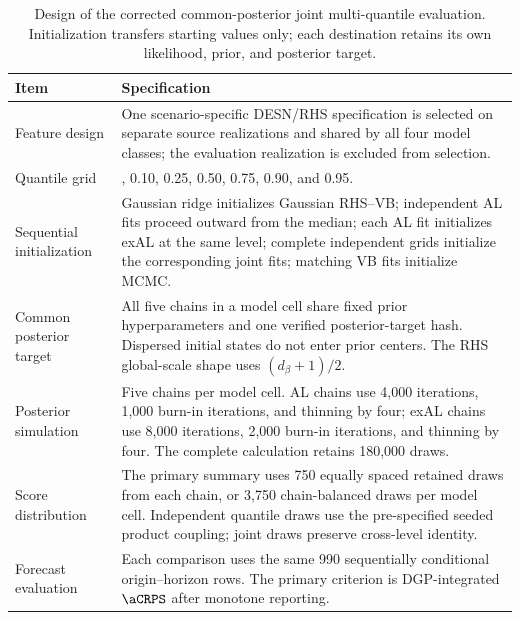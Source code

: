 \begin{table}[!htbp]
\centering
\scriptsize
\begin{tabular}{@{}>{\raggedright\arraybackslash}p{}>{\raggedright\arraybackslash}p{}@{}}
\toprule
Item & Specification \\
\midrule
Feature design & One scenario-specific DESN/RHS specification is selected on separate source realizations and shared by all four model classes; the evaluation realization is excluded from selection. \\
Quantile grid & 0.05, 0.10, 0.25, 0.50, 0.75, 0.90, and 0.95. \\
Sequential initialization & Gaussian ridge initializes Gaussian RHS--VB; independent AL fits proceed outward from the median; each AL fit initializes exAL at the same level; complete independent grids initialize the corresponding joint fits; matching VB fits initialize MCMC. \\
Common posterior target & All five chains in a model cell share fixed prior hyperparameters and one verified posterior-target hash. Dispersed initial states do not enter prior centers. The RHS global-scale shape uses \((d_\beta+1)/2\). \\
Posterior simulation & Five chains per model cell. AL chains use 4,000 iterations, 1,000 burn-in iterations, and thinning by four; exAL chains use 8,000 iterations, 2,000 burn-in iterations, and thinning by four. The complete calculation retains 180,000 draws. \\
Score distribution & The primary summary uses 750 equally spaced retained draws from each chain, or 3,750 chain-balanced draws per model cell. Independent quantile draws use the pre-specified seeded product coupling; joint draws preserve cross-level identity. \\
Forecast evaluation & Each comparison uses the same 990 sequentially conditional origin--horizon rows. The primary criterion is DGP-integrated \(\aCRPS\) after monotone reporting. \\
\bottomrule
\end{tabular}
\caption{Design of the corrected common-posterior joint multi-quantile evaluation. Initialization transfers starting values only; each destination retains its own likelihood, prior, and posterior target.}
\label{qdesn:tab:joint-qdesn-corrected-v4-protocol}
\end{table}
